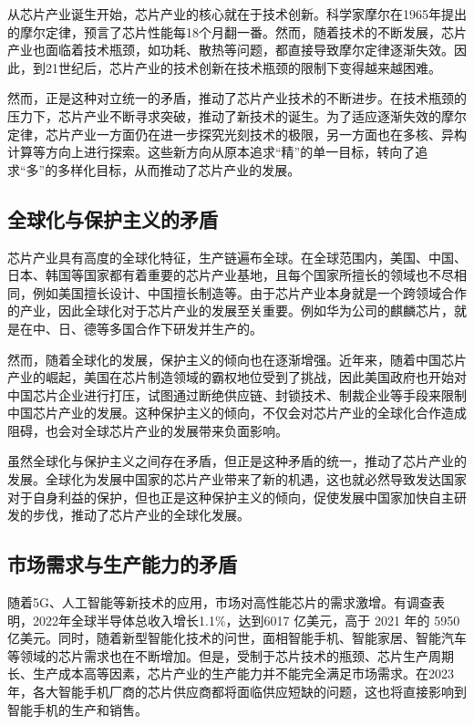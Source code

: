 \documentclass[12pt,hyperref,a4paper,UTF8]{ctexart}
\begin{document}
从芯片产业诞生开始，芯片产业的核心就在于技术创新。科学家摩尔在1965年提出的摩尔定律，预言了芯片性能每18个月翻一番。然而，随着技术的不断发展，芯片产业也面临着技术瓶颈，如功耗、散热等问题，都直接导致摩尔定律逐渐失效。因此，到21世纪后，芯片产业的技术创新在技术瓶颈的限制下变得越来越困难。

然而，正是这种对立统一的矛盾，推动了芯片产业技术的不断进步。在技术瓶颈的压力下，芯片产业不断寻求突破，推动了新技术的诞生。为了适应逐渐失效的摩尔定律，芯片产业一方面仍在进一步探究光刻技术的极限，另一方面也在多核、异构计算等方向上进行探索。这些新方向从原本追求“精”的单一目标，转向了追求“多”的多样化目标，从而推动了芯片产业的发展。

\subsection{全球化与保护主义的矛盾}

芯片产业具有高度的全球化特征，生产链遍布全球。在全球范围内，美国、中国、日本、韩国等国家都有着重要的芯片产业基地，且每个国家所擅长的领域也不尽相同，例如美国擅长设计、中国擅长制造等。由于芯片产业本身就是一个跨领域合作的产业，因此全球化对于芯片产业的发展至关重要。例如华为公司的麒麟芯片，就是在中、日、德等多国合作下研发并生产的。

然而，随着全球化的发展，保护主义的倾向也在逐渐增强。近年来，随着中国芯片产业的崛起，美国在芯片制造领域的霸权地位受到了挑战，因此美国政府也开始对中国芯片企业进行打压，试图通过断绝供应链、封锁技术、制裁企业等手段来限制中国芯片产业的发展。这种保护主义的倾向，不仅会对芯片产业的全球化合作造成阻碍，也会对全球芯片产业的发展带来负面影响。

虽然全球化与保护主义之间存在矛盾，但正是这种矛盾的统一，推动了芯片产业的发展。全球化为发展中国家的芯片产业带来了新的机遇，这也就必然导致发达国家对于自身利益的保护，但也正是这种保护主义的倾向，促使发展中国家加快自主研发的步伐，推动了芯片产业的全球化发展。

\subsection{市场需求与生产能力的矛盾}

随着5G、人工智能等新技术的应用，市场对高性能芯片的需求激增。有调查表明，2022年全球半导体总收入增长1.1\%，达到6017 亿美元，高于 2021 年的 5950 亿美元。同时，随着新型智能化技术的问世，面相智能手机、智能家居、智能汽车等领域的芯片需求也在不断增加。但是，受制于芯片技术的瓶颈、芯片生产周期长、生产成本高等因素，芯片产业的生产能力并不能完全满足市场需求。在2023年，各大智能手机厂商的芯片供应商都将面临供应短缺的问题，这也将直接影响到智能手机的生产和销售。
\end{document}
